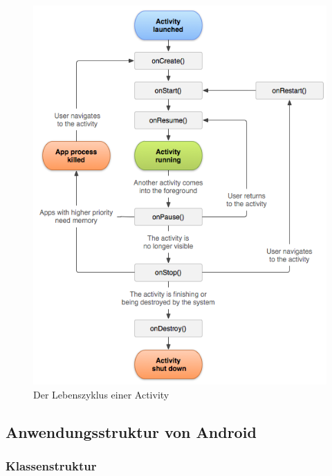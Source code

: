 \begin{figure}[ht!]
\begin{center}
\includegraphics[scale=.7]{images/activity_lifecycle}
\caption{Der Lebenszyklus einer Activity}
\label{permissions}
\end{center}
\end{figure}


\label{sdk}
\subsection{Anwendungsstruktur von Android}
\subsubsection{Klassenstruktur}

